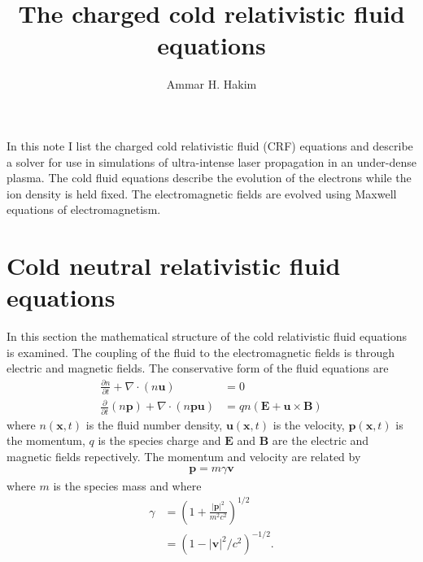 \documentclass[11pt, reqno]{amsart}
\title{The charged cold relativistic fluid equations}%
\author{Ammar H. Hakim}%
\date{}
\newcommand{\pfrac}[2]{\frac{\partial #1}{\partial #2}}
\newcommand{\pfraca}[1]{\frac{\partial}{\partial #1}}
\newcommand{\mvec}[1]{\mathbf{#1}}
\theoremstyle{definition}
\begin{document}

\maketitle

In this note I list the charged cold relativistic fluid (CRF)
equations and describe a solver for use in simulations of
ultra-intense laser propagation in an under-dense plasma. The cold
fluid equations describe the evolution of the electrons while the ion
density is held fixed. The electromagnetic fields are evolved using
Maxwell equations of electromagnetism.

\section{Cold neutral relativistic fluid equations}

In this section the mathematical structure of the cold relativistic
fluid equations is examined. The coupling of the fluid to the
electromagnetic fields is through electric and magnetic fields. The
conservative form of the fluid equations are
\begin{align}
  \pfrac{n}{t} + \nabla\cdot(n\mvec{u}) &= 0 \\
  \pfraca{t}(n\mvec{p}) + \nabla\cdot (n\mvec{p}\mvec{u}) &= 
  qn\left(\mvec{E} + \mvec{u}\times\mvec{B}\right)
\end{align}
where $n(\mvec{x},t)$ is the fluid number density,
$\mvec{u}(\mvec{x},t)$ is the velocity, $\mvec{p}(\mvec{x},t)$ is the
momentum, $q$ is the species charge and $\mvec{E}$ and $\mvec{B}$ are
the electric and magnetic fields repectively. The momentum and
velocity are related by
\begin{align}
  \mvec{p} = m\gamma \mvec{v}
\end{align}
where $m$ is the species mass and where
\begin{align}
  \gamma &= \left(1+\frac{|\mvec{p}|^2}{m^2c^2}\right)^{1/2} \\
  &= \left(1-|\mvec{v}|^2/c^2\right)^{-1/2}.
\end{align}
\end{document}
